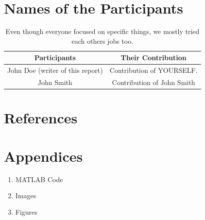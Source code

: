 \documentclass[11pt]{article}
\begin{document}
\section{Names of the Participants}


\begin{table}[H]
    \centering
    \begin{tabular}{| c : c |}
    \hline
        \textbf{Participants} & \textbf{Their Contribution} \\
    \hline\hline
        John Doe (writer of this report) & Contribution of YOURSELF. \\
    \hline
        John Smith & Contribution of John Smith \\
    \hline
    \end{tabular}
    \caption{Even though everyone focused on specific things, we mostly tried each others jobs too.}
\end{table}



\section{References}


\vspace{-1cm} %

\section{Appendices}


\begin{enumerate}
    \item MATLAB Code
    \item Images
    \item Figures %
\end{enumerate}
\end{document}
